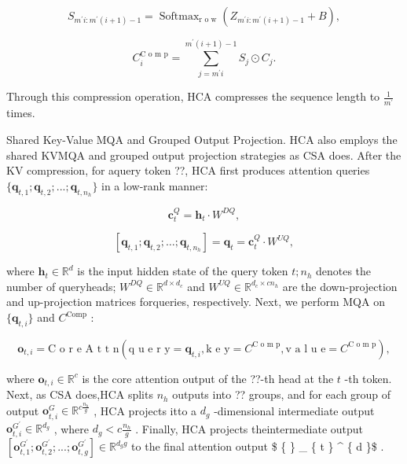\documentclass[
  10
]{article}
\begin{document}
\[
S _ {m ^ {\prime} i: m ^ {\prime} (i + 1) - 1} = \operatorname {S o f t m a x} _ {\text {r o w}} \left(Z _ {m ^ {\prime} i: m ^ {\prime} (i + 1) - 1} + B\right), \tag {22}
\]

\[
C _ {i} ^ {\text {C o m p}} = \sum_ {j = m ^ {\prime} i} ^ {m ^ {\prime} (i + 1) - 1} S _ {j} \odot C _ {j}. \tag {23}
\]

Through this compression operation, HCA compresses the sequence length
to \(\scriptstyle { \frac { 1 } { m ^ { \prime } } }\) times.

Shared Key-Value MQA and Grouped Output Projection. HCA also employs the
shared KVMQA and grouped output projection strategies as CSA does. After
the KV compression, for aquery token ??, HCA first produces attention
queries
\(\{ \mathbf { q } _ { t , 1 } ; \mathbf { q } _ { t , 2 } ; . . . ; \mathbf { q } _ { t , n _ { h } } \}\)
in a low-rank manner:

\[
\mathbf {c} _ {t} ^ {Q} = \mathbf {h} _ {t} \cdot W ^ {D Q}, \tag {24}
\]

\[
[ \mathbf {q} _ {t, 1}; \mathbf {q} _ {t, 2}; \dots ; \mathbf {q} _ {t, n _ {h}} ] = \mathbf {q} _ {t} = \mathbf {c} _ {t} ^ {Q} \cdot W ^ {U Q}, \tag {25}
\]

where \(\mathbf h _ { t } \in \mathbb R ^ { d }\) is the input hidden
state of the query token \(t ; n _ { h }\) denotes the number of
queryheads; \(W ^ { D Q } \in \mathbb { R } ^ { d \times d _ { c } }\)
and \(W ^ { U Q } \in \mathbb { R } ^ { d _ { c } \times c n _ { h } }\)
are the down-projection and up-projection matrices forqueries,
respectively. Next, we perform MQA on
\(\{ \mathbf { q } _ { t , i } \}\) and \(C ^ { \mathrm { C o m p } }\)
:

\[
\mathbf {o} _ {t, i} = \text {C o r e A t t n} \left(\text {q u e r y} = \mathbf {q} _ {t, i}, \text {k e y} = C ^ {\text {C o m p}}, \text {v a l u e} = C ^ {\text {C o m p}}\right), \tag {26}
\]

where \(\mathbf { o } _ { t , i } \in \mathbb { R } ^ { c }\) is the
core attention output of the ??-th head at the \(t\) -th token. Next, as
CSA does,HCA splits \(n _ { h }\) outputs into ?? groups, and for each
group of output
\({ \mathbf o } _ { t , i } ^ { G } \in \mathbb { R } ^ { c \frac { n _ { h } } { g } }\)
, HCA projects itto a \(d _ { g }\) -dimensional intermediate output
\({ \mathbf o } _ { t , i } ^ { G ^ { \prime } } \in \mathbb { R } ^ { d _ { g } }\)
, where \(d _ { g } < c \frac { n _ { h } } { g }\) . Finally, HCA
projects theintermediate output
\([ \mathbf { o } _ { t , 1 } ^ { G ^ { \prime } } ; \mathbf { o } _ { t , 2 } ^ { G ^ { \prime } } ; . . . ; \mathbf { o } _ { t , g } ^ { G ^ { \prime } } ] \in \mathbb { R } ^ { d _ { g } g }\)
to the final attention output \$ \{  \} \_ \{ t \}
\in {} \^{} \{ d \}\$ .
\end{document}
